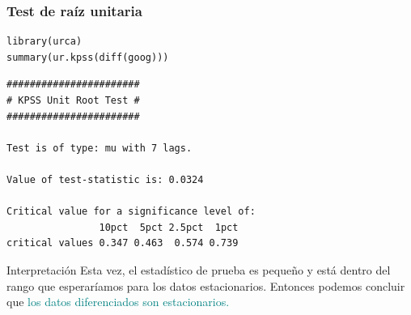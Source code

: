 \documentclass[10pt]{beamer}
\begin{document}







\begin{frame}[fragile]
\frametitle{Test de raíz unitaria}


\lstset{language=r,label= ,caption= ,captionpos=b,numbers=none}
\begin{lstlisting}
library(urca)
summary(ur.kpss(diff(goog)))
\end{lstlisting}

\pause

{\scriptsize
\begin{verbatim}
####################### 
# KPSS Unit Root Test # 
####################### 

Test is of type: mu with 7 lags. 

Value of test-statistic is: 0.0324 

Critical value for a significance level of: 
                10pct  5pct 2.5pct  1pct
critical values 0.347 0.463  0.574 0.739
\end{verbatim}
}

\pause

{\small
\begin{block}{Interpretación}
Esta vez, el estadístico de prueba \textbf{} es pequeño y está dentro del rango que esperaríamos para los datos estacionarios. Entonces podemos concluir que \textcolor{teal}{los datos diferenciados son estacionarios.}
\end{block}
}


\end{frame}


\end{document}
